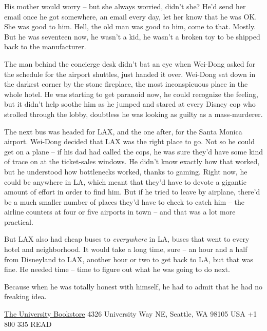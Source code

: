 His mother would worry -- but she always worried, didn't she? He'd
send her email once he got somewhere, an email every day, let her
know that he was OK. She was good to him. Hell, the old man was
good to him, come to that. Mostly. But he was seventeen now, he
wasn't a kid, he wasn't a broken toy to be shipped back to the
manufacturer.

The man behind the concierge desk didn't bat an eye when Wei-Dong
asked for the schedule for the airport shuttles, just handed it
over. Wei-Dong sat down in the darkest corner by the stone
fireplace, the most inconspicuous place in the whole hotel. He was
starting to get paranoid now, he could recognize the feeling, but
it didn't help soothe him as he jumped and stared at every Disney
cop who strolled through the lobby, doubtless he was looking as
guilty as a mass-murderer.

The next bus was headed for LAX, and the one after, for the Santa
Monica airport. Wei-Dong decided that LAX was the right place to
go. Not so he could get on a plane -- if his dad had called the
cops, he was sure they'd have some kind of trace on at the
ticket-sales windows. He didn't know exactly how that worked, but
he understood how bottlenecks worked, thanks to gaming. Right now,
he could be anywhere in LA, which meant that they'd have to devote
a gigantic amount of effort in order to find him. But if he tried
to leave by airplane, there'd be a much smaller number of places
they'd have to check to catch him -- the airline counters at four
or five airports in town -- and that was a lot more practical.

But LAX also had cheap buses to \emph{everywhere} in LA, buses that
went to every hotel and neighborhood. It would take a long time,
sure -- an hour and a half from Disneyland to LAX, another hour or
two to get back to LA, but that was fine. He needed time -- time to
figure out what he was going to do next.

Because when he was totally honest with himself, he had to admit
that he had no freaking idea.

\tb

{\href{http://www4.bookstore.washington.edu/\_trade/ShowTitleUBS.taf?ActionArg=Title\&ISBN=9780765322166}{The University Bookstore} 4326 University Way NE, Seattle, WA 98105 USA +1 800 335 READ}

